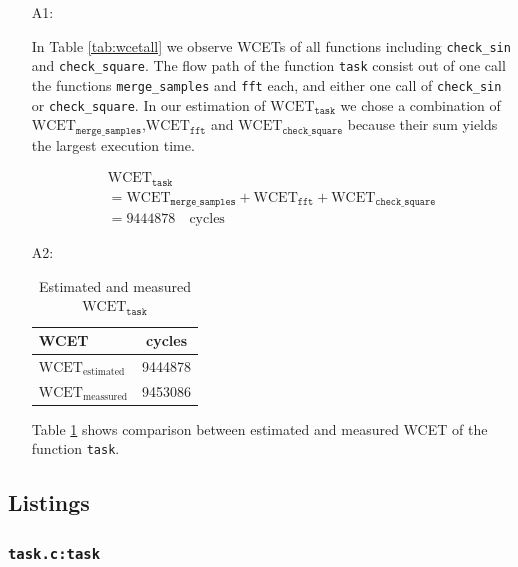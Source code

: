 \documentclass[12pt,a4paper,titlepage,oneside]{article}
\begin{document}
\begin{itemize}
\item[A1:]

In Table \ref{tab:wcetall} we observe WCETs of all functions including \texttt{check\_sin} and \texttt{check\_square}. The flow path of the function \texttt{task} consist out of one call the functions \texttt{merge\_samples} and \texttt{fft} each, and either one call of \texttt{check\_sin} or \texttt{check\_square}. In our estimation of $\mathrm{WCET}_{\mathtt{task}}$ we chose a combination of $\mathrm{WCET}_{\mathtt{merge\_samples}}$,$\mathrm{WCET}_{\mathtt{fft}}$ and $\mathrm{WCET}_{\mathtt{check\_square}}$ because their sum yields the largest execution time. 

\begin{multline*}
\mathrm{WCET}_{\mathtt{task}}\\
= \mathrm{WCET}_{\mathtt{merge\_samples}}  +  \mathrm{WCET}_{\mathtt{fft}}   +  \mathrm{WCET}_{\mathtt{check\_square}}\\
            = 9444878 \quad \mathrm{cycles}
\end{multline*}  

\item[A2:]

\begin{table}[H]
\centering
\begin{tabular}{l|c}
\hline
WCET & cycles\\
\hline
$\mathrm{WCET}_{\mathrm{estimated}}$ & 9444878 \\
$\mathrm{WCET}_{\mathrm{meassured}}$ & 9453086 \\
\hline
\end{tabular}
\caption{Estimated and measured $\mathrm{WCET}_{\mathtt{task}}$}
\label{tab:wcecomp}
\end{table}

Table \ref{tab:wcecomp} shows comparison between estimated and measured WCET of the function \texttt{task}.  

\end{itemize}


\subsection{Listings}

\subsubsection{\texttt{task.c:task}}


\end{document}

